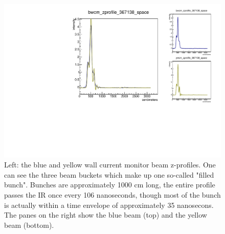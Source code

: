 \begin{figure}
\begin{center}
\includegraphics[width=\linewidth,height=\textheight,keepaspectratio]{../HourglassCorrection/figs/367138_wcm_zprofile}
\caption{ 
Left: the blue and yellow wall current monitor beam z-profiles. One can see the
three beam buckets which make up one so-called "filled bunch". Bunches are
approximately 1000 cm long, the entire profile passes the IR once every 106
nanoseconds, though most of the bunch is actually within a time envelope of
approximately 35 nanosecons. The panes on the right show the blue beam (top)
and the yellow beam (bottom).
}
\label{fig:367138_wcm_zprofile}
\end{center}
\end{figure}
